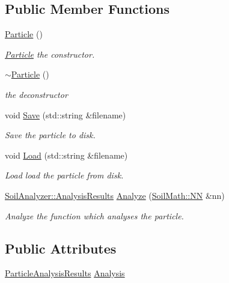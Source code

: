 \subsection*{Public Member Functions}
\begin{DoxyCompactItemize}
\item 
\hyperlink{class_soil_analyzer_1_1_particle_ac01adbc5a4a30350985c0076da52e7da}{Particle} ()
\begin{DoxyCompactList}\small\item\em \hyperlink{class_soil_analyzer_1_1_particle}{Particle} the constructor. \end{DoxyCompactList}\item 
\hyperlink{class_soil_analyzer_1_1_particle_ad2a5896d3ddf67275db18971bf43fbfe}{$\sim$\+Particle} ()
\begin{DoxyCompactList}\small\item\em the deconstructor \end{DoxyCompactList}\item 
void \hyperlink{class_soil_analyzer_1_1_particle_acf374749108de7599ffca9e065b60447}{Save} (std\+::string \&filename)
\begin{DoxyCompactList}\small\item\em Save the particle to disk. \end{DoxyCompactList}\item 
void \hyperlink{class_soil_analyzer_1_1_particle_aed56f2a819047d43895e33bf84e1f6a6}{Load} (std\+::string \&filename)
\begin{DoxyCompactList}\small\item\em Load load the particle from disk. \end{DoxyCompactList}\item 
\hyperlink{class_soil_analyzer_1_1_analysis_results}{Soil\+Analyzer\+::\+Analysis\+Results} \hyperlink{class_soil_analyzer_1_1_particle_aeb4ed9f49b88f5d6563b993154aabe50}{Analyze} (\hyperlink{class_soil_math_1_1_n_n}{Soil\+Math\+::\+N\+N} \&nn)
\begin{DoxyCompactList}\small\item\em Analyze the function which analyses the particle. \end{DoxyCompactList}\end{DoxyCompactItemize}
\subsection*{Public Attributes}
\begin{DoxyCompactItemize}
\item 
\hyperlink{class_soil_analyzer_1_1_particle_analysis_results}{Particle\+Analysis\+Results} \hyperlink{class_soil_analyzer_1_1_particle_a4df8d4d8fb130bce05fef5d4601ef89e}{Analysis}
\end{DoxyCompactItemize}
